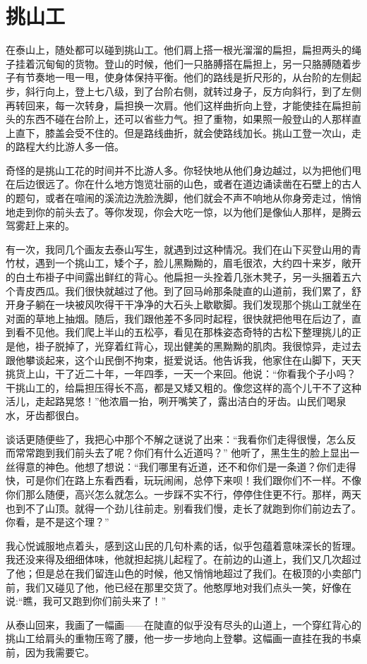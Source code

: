 \documentclass[12pt,UTF-8,openany]{ctexbook}
\begin{document}
\chapter{挑山工}

\begin{large}
    
    在泰山上，随处都可以碰到挑山工。他们肩上搭一根光溜溜的扁担，扁担两头的绳子挂着沉甸甸的货物。登山的时候，他们一只胳膊搭在扁担上，另一只胳膊随着步子有节奏地一甩一甩，使身体保持平衡。他们的路线是折尺形的，从台阶的左侧起步，斜行向上，登上七八级，到了台阶右侧，就转过身子，反方向斜行，到了左侧再转回来，每一次转身，扁担换一次肩。他们这样曲折向上登，才能使挂在扁担前头的东西不碰在台阶上，还可以省些力气。担了重物，如果照一般登山的人那样直上直下，膝盖会受不住的。但是路线曲折，就会使路线加长。挑山工登一次山，走的路程大约比游人多一倍。
    
    奇怪的是挑山工花的时间并不比游人多。你轻快地从他们身边越过，以为把他们甩在后边很远了。你在什么地方饱览壮丽的山色，或者在道边诵读凿在石壁上的古人的题句，或者在喧闹的溪流边洗脸洗脚，他们就会不声不响地从你身旁走过，悄悄地走到你的前头去了。等你发现，你会大吃一惊，以为他们是像仙人那样，是腾云驾雾赶上来的。
    
    有一次，我同几个画友去泰山写生，就遇到过这种情况。我们在山下买登山用的青竹杖，遇到一个挑山工，矮个子，脸儿黑黝黝的，眉毛很浓，大约四十来岁，敞开的白土布褂子中间露出鲜红的背心。他扁担一头拴着几张木凳子，另一头捆着五六个青皮西瓜。我们很快就越过了他。到了回马岭那条陡直的山道前，我们累了，舒开身子躺在一块被风吹得干干净净的大石头上歇歇脚。我们发现那个挑山工就坐在对面的草地上抽烟。随后，我们跟他差不多同时起程，很快就把他甩在后边了，直到看不见他。我们爬上半山的五松亭，看见在那株姿态奇特的古松下整理挑儿的正是他，褂子脱掉了，光穿着红背心，现出健美的黑黝黝的肌肉。我很惊异，走过去跟他攀谈起来，这个山民倒不拘束，挺爱说话。他告诉我，他家住在山脚下，天天挑货上山，干了近二十年，一年四季，一天一个来回。他说：“你看我个子小吗？干挑山工的，给扁担压得长不高，都是又矮又粗的。像您这样的高个儿干不了这种活儿，走起路晃悠！”他浓眉一抬，咧开嘴笑了，露出洁白的牙齿。山民们喝泉水，牙齿都很白。
    
    谈话更随便些了，我把心中那个不解之谜说了出来：“我看你们走得很慢，怎么反而常常跑到我们前头去了呢？你们有什么近道吗？” 他听了，黑生生的脸上显出一丝得意的神色。他想了想说：“我们哪里有近道，还不和你们是一条道？你们走得快，可是你们在路上东看西看，玩玩闹闹，总停下来呗！我们跟你们不一样。不像你们那么随便，高兴怎么就怎么。一步踩不实不行，停停住住更不行。那样，两天也到不了山顶。就得一个劲儿往前走。别看我们慢，走长了就跑到你们前边去了。你看，是不是这个理？”
    
    我心悦诚服地点着头，感到这山民的几句朴素的话，似乎包蕴着意味深长的哲理。我还没来得及细细体味，他就担起挑儿起程了。在前边的山道上，我们又几次超过了他；但是总在我们留连山色的时候，他又悄悄地超过了我们。在极顶的小卖部门前，我们又碰见了他，他已经在那里交货了。他憨厚地对我们点头一笑，好像在说:“瞧，我可又跑到你们前头来了！”
    
    从泰山回来，我画了一幅画——在陡直的似乎没有尽头的山道上，一个穿红背心的挑山工给肩头的重物压弯了腰，他一步一步地向上登攀。这幅画一直挂在我的书桌前，因为我需要它。
    
\end{large}
\end{document}
